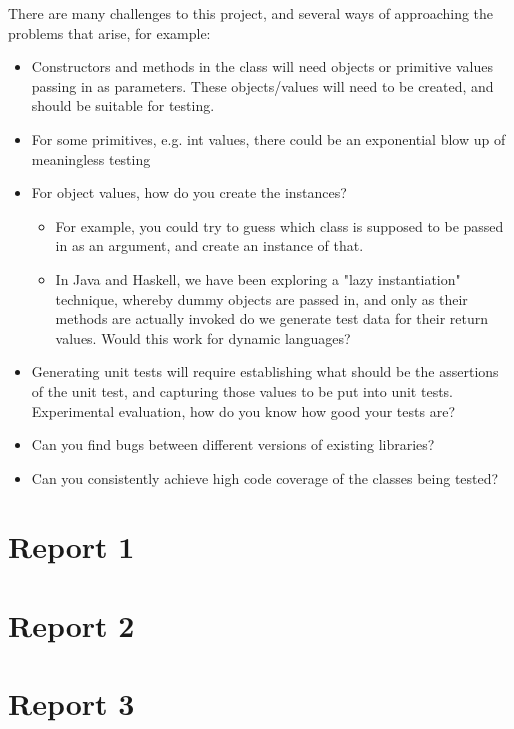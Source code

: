 There are many challenges to this project, and several ways of
approaching the problems that arise, for example:

\begin{itemize}
\item Constructors and methods in the class will need objects or primitive
  values passing in as parameters. These objects/values will need
  to be created, and should be suitable for testing.

\item For some primitives, e.g. int values, there could be an exponential
  blow up of meaningless testing

\item For object values, how do you create the instances?
\begin{itemize}
\item For example, you could try to guess which class is supposed to be
      passed in as an argument, and create an instance of that.
\item In Java and Haskell, we have been exploring a "lazy
      instantiation" technique, whereby dummy objects are passed in,
      and only as their methods are actually invoked do we generate
      test data for their return values. Would this work for dynamic
      languages?
\end{itemize}

\item Generating unit tests will require establishing what should be the
      assertions of the unit test, and capturing those values to be put
      into unit tests.
      Experimental evaluation, how do you know how good your tests are?

\item Can you find bugs between different versions of existing libraries?

\item Can you consistently achieve high code coverage of the classes
      being tested?
\end{itemize}
\chapter{Report 1}
\chapter{Report 2}
\chapter{Report 3}
